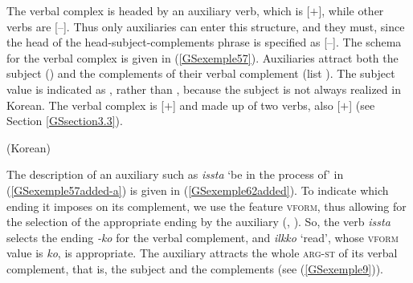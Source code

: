 {The verbal complex is headed by an auxiliary verb, which is [\aux $+$], while other verbs are [\aux $–$].  Thus only auxiliaries can enter this structure, and they must, since the head of the head-subject-complements phrase is specified as [\aux $–$]. The schema for the verbal complex is given in (\ref{GSexemple57}). Auxiliaries attract both the subject () and the complements of their verbal complement (list ). The subject value is indicated as , rather than \la{}\ra, because the subject is not always realized in Korean. The verbal complex is [\light $+$] and made up of two verbs, also [\light $+$] (see Section \ref{GSsection3.3}). 


\ea 
\label{GSexemple57}
 (Korean) \impl \\
\z


The description of an auxiliary such as \emph{issta} `be in the process of' in (\ref{GSexemple57added-a}) is given in (\ref{GSexemple62added}). To indicate which ending it imposes on its complement, we use the feature \textsc{vform}, thus allowing for the selection of the appropriate ending by the auxiliary (\citealt{Chung98a-u}, \citealt{Kim2016a-u}). So, the verb \emph{issta} selects the ending \emph{-ko} for the verbal complement, and \emph{ilkko} `read', whose \textsc{vform} value is \emph{ko}, is appropriate. The auxiliary attracts the whole \textsc{arg-st} of its verbal complement, that is, the subject  and the complements  (see (\ref{GSexemple9})). 

}
